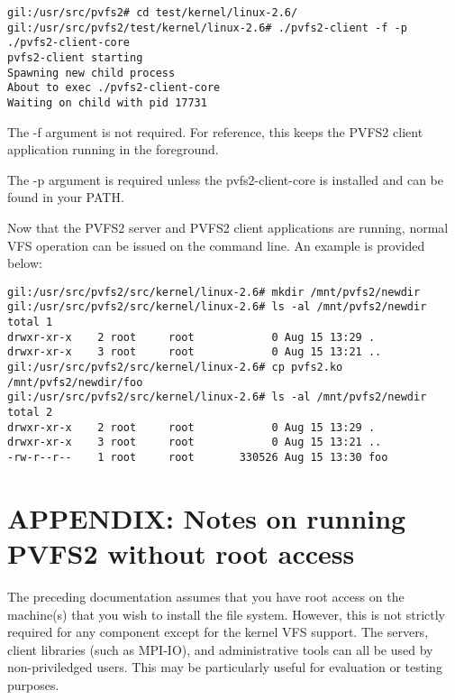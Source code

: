 \documentclass[11pt, letterpaper]{article}
\begin{document}
\begin{verbatim}
gil:/usr/src/pvfs2# cd test/kernel/linux-2.6/
gil:/usr/src/pvfs2/test/kernel/linux-2.6# ./pvfs2-client -f -p ./pvfs2-client-core
pvfs2-client starting
Spawning new child process
About to exec ./pvfs2-client-core
Waiting on child with pid 17731
\end{verbatim}

The -f argument is not required.  For reference, this keeps the PVFS2
client application running in the foreground.

The -p argument is required unless the pvfs2-client-core is installed
and can be found in your PATH.

Now that the PVFS2 server and PVFS2 client applications are running,
normal VFS operation can be issued on the command line.  An example is
provided below:

\begin{verbatim}
gil:/usr/src/pvfs2/src/kernel/linux-2.6# mkdir /mnt/pvfs2/newdir
gil:/usr/src/pvfs2/src/kernel/linux-2.6# ls -al /mnt/pvfs2/newdir
total 1
drwxr-xr-x    2 root     root            0 Aug 15 13:29 .
drwxr-xr-x    3 root     root            0 Aug 15 13:21 ..
gil:/usr/src/pvfs2/src/kernel/linux-2.6# cp pvfs2.ko
/mnt/pvfs2/newdir/foo
gil:/usr/src/pvfs2/src/kernel/linux-2.6# ls -al /mnt/pvfs2/newdir
total 2
drwxr-xr-x    2 root     root            0 Aug 15 13:29 .
drwxr-xr-x    3 root     root            0 Aug 15 13:21 ..
-rw-r--r--    1 root     root       330526 Aug 15 13:30 foo
\end{verbatim}

\appendix

\section{APPENDIX: Notes on running PVFS2 without root access}

The preceding documentation assumes that you have root access on the
machine(s) that you wish to install the file system.  However, this is not
strictly required for any component except for the kernel VFS support.  The
servers, client libraries (such as MPI-IO), and administrative tools can all
be used by non-priviledged users.  This may be particularly useful for
evaluation or testing purposes.
\end{document}

